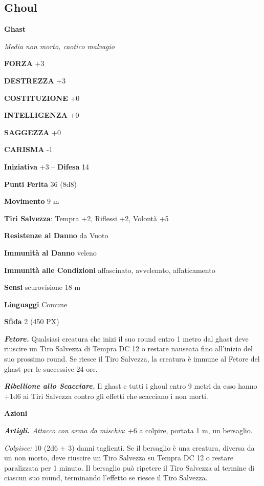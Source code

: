 \begin{multicols}{2}
	\subsection{Ghoul}

	\medskip{}\textbf{Ghast}

	\textit{Media non morto, caotico malvagio}

	\textbf{FORZA} +3

	\textbf{DESTREZZA} +3

	\textbf{COSTITUZIONE} +0

	\textbf{INTELLIGENZA} +0

	\textbf{SAGGEZZA} +0

	\textbf{CARISMA} -1

	\textbf{Iniziativa} +3 -- \textbf{Difesa} 14

	\textbf{Punti Ferita} 36 (8d8)

	\textbf{Movimento} 9 m

	\textbf{Tiri Salvezza}: Tempra +2, Riflessi +2, Volontà +5

	\textbf{Resistenze al Danno} da Vuoto

	\textbf{Immunità al Danno} veleno

	\textbf{Immunità alle Condizioni} affascinato, avvelenato, affaticamento

	\textbf{Sensi} scurovisione 18 m

	\textbf{Linguaggi} Comune

	\textbf{Sfida} 2 (450 PX)

	\textit{\textbf{Fetore.}} Qualsiasi creatura che inizi il suo round entro 1 metro dal ghast deve riuscire un Tiro Salvezza di Tempra DC 12 o restare nauseata fino all'inizio del suo prossimo round. Se riesce il Tiro Salvezza, la creatura è immune al Fetore del ghast per le successive 24
	ore.

	\textit{\textbf{Ribellione allo Scacciare.}} Il ghast e tutti i ghoul entro 9 metri da esso hanno +1d6 ai Tiri Salvezza contro gli effetti che scacciano i non morti.

	\textbf{Azioni}

	\textit{\textbf{Artigli.} Attacco con arma da mischia}: +6 a colpire, portata 1 m, un bersaglio.

	\textit{Colpisce:} 10 (2d6 + 3) danni taglienti. Se il bersaglio è una creatura, diversa da un non morto, deve riuscire un Tiro Salvezza su Tempra DC 12 o restare paralizzata per 1 minuto. Il bersaglio può ripetere il Tiro Salvezza al termine di ciascun suo round, terminando l'effetto se riesce il Tiro Salvezza.


\end{multicols}
